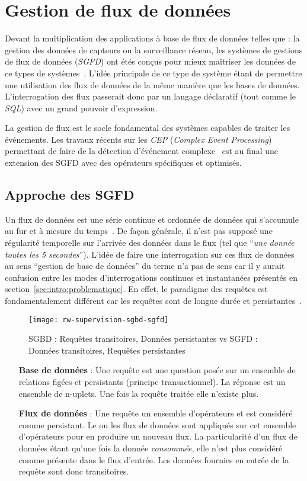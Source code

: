 \section{Gestion de flux de données}\label{sec:rw:supervision:datastream}
Devant la multiplication des applications à base de flux de données telles que : la gestion des données de capteurs ou la surveillance réseau, les systèmes de gestions de flux de données (\textit{SGFD}) ont étés conçus pour mieux maîtriser les données de ce types de systèmes~\cite{Madden:tag, Yao:cougar, Cranor:gigascope}. L'idée principale de ce type de système étant de permettre une utilisation des flux de données de la même manière que les bases de données. L'interrogation des flux passerait donc par un langage déclaratif (tout comme le \textit{SQL}) avec un grand pouvoir d'expression.

La gestion de flux est le socle fondamental des systèmes capables de traiter les événements. Les travaux récents sur les \textit{CEP} (\textit{Complex Event Processing}) permettant de faire de la détection d'événement complexe~\cite{Brenna:cayuga} est au final une extension des SGFD avec des opérateurs spécifiques et optimisés.
\subsection{Approche des SGFD}
Un flux de données est une série continue et ordonnée de données qui s'accumule au fur et à mesure du temps~\cite{Golab:issues}. De façon générale, il n'est pas supposé une régularité temporelle sur l'arrivée des données dans le flux (tel que \enquote{\it une donnée toutes les 5 secondes}). L'idée de faire une interrogation sur ces flux de données au sens \enquote{gestion de base de données} du terme n'a pas de sens car il y aurait confusion entre les modes d'interrogations continues et instantanées présentés en section~\ref{sec:intro:problematique}. En effet, le paradigme des requêtes est fondamentalement différent car les requêtes sont de longue durée et persistantes~\cite{Chen:niagaracq}.
\begin{figure}[ht]
    \centering
    \texttt{[image: rw-supervision-sgbd-sgfd]}
    \caption{SGBD : Requêtes transitoires, Données persistantes vs SGFD : Données transitoires, Requêtes persistantes~\protect\cite{Gurgen:sstreamware}}
\end{figure}

\begin{itemize}
    \item[\textbf{Base de données}] : Une requête est une question posée sur un ensemble de relations figées et persistants (principe transactionnel). La réponse est un ensemble de n-uplets. Une fois la requête traitée elle n'existe plus.
    \item[\textbf{Flux de données}] : Une requête un ensemble d'opérateurs et est considéré comme persistant. Le ou les flux de données sont appliqués sur cet ensemble d'opérateurs pour en produire un nouveau flux. La particularité d'un flux de données étant qu'une fois la donnée \textit{consommée}, elle n'est plus considéré comme présente dans le flux d'entrée. Les données fournies en entrée de la requête sont donc transitoires.
\end{itemize}

